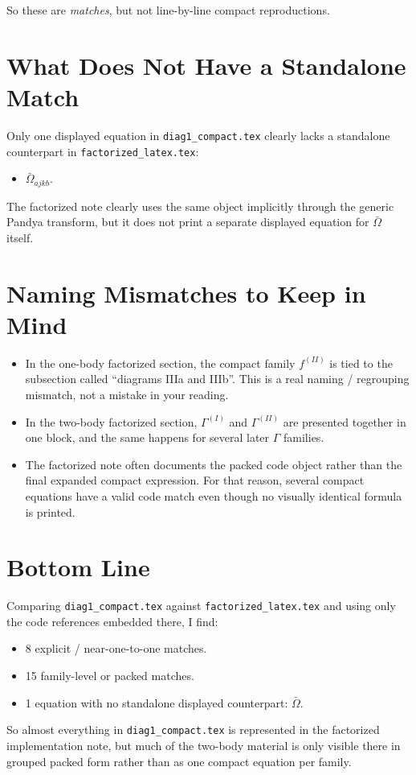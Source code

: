 \documentclass{article}
\begin{document}
So these are \emph{matches}, but not line-by-line compact reproductions.

\section*{What Does Not Have a Standalone Match}

Only one displayed equation in \texttt{diag1\_compact.tex} clearly lacks a
standalone counterpart in \texttt{factorized\_latex.tex}:
\begin{itemize}
\item $\bar\Omega_{ajkb}$.
\end{itemize}

The factorized note clearly uses the same object implicitly through the generic
Pandya transform, but it does not print a separate displayed equation for
$\bar\Omega$ itself.

\section*{Naming Mismatches to Keep in Mind}

\begin{itemize}
\item In the one-body factorized section, the compact family $f^{(II)}$ is tied
  to the subsection called ``diagrams IIIa and IIIb''. This is a real naming /
  regrouping mismatch, not a mistake in your reading.
\item In the two-body factorized section, $\Gamma^{(I)}$ and $\Gamma^{(II)}$ are
  presented together in one block, and the same happens for several later
  $\Gamma$ families.
\item The factorized note often documents the packed code object rather than the
  final expanded compact expression. For that reason, several compact equations
  have a valid code match even though no visually identical formula is printed.
\end{itemize}

\section*{Bottom Line}

Comparing \texttt{diag1\_compact.tex} against \texttt{factorized\_latex.tex} and
using only the code references embedded there, I find:
\begin{itemize}
\item 8 explicit / near-one-to-one matches.
\item 15 family-level or packed matches.
\item 1 equation with no standalone displayed counterpart: $\bar\Omega$.
\end{itemize}

So almost everything in \texttt{diag1\_compact.tex} is represented in the
factorized implementation note, but much of the two-body material is only
visible there in grouped packed form rather than as one compact equation per
family.
\end{document}

